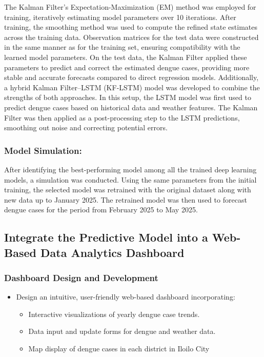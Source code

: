 The Kalman Filter's Expectation-Maximization (EM) method was employed for training, iteratively estimating model parameters over 10 iterations. After training, the smoothing method was used to compute the refined state estimates across the training data. Observation matrices for the test data were constructed in the same manner as for the training set, ensuring compatibility with the learned model parameters. On the test data, the Kalman Filter applied these parameters to predict and correct the estimated dengue cases, providing more stable and accurate forecasts compared to direct regression models. Additionally, a hybrid Kalman Filter–LSTM (KF-LSTM) model was developed to combine the strengths of both approaches. In this setup, the LSTM model was first used to predict dengue cases based on historical data and weather features. The Kalman Filter was then applied as a post-processing step to the LSTM predictions, smoothing out noise and correcting potential errors.

\subsubsection{Model Simulation:}
After identifying the best-performing model among all the trained deep learning models, a simulation was conducted. Using the same parameters from the initial training, the selected model was retrained with the original dataset along with new data up to January 2025. The retrained model was then used to forecast dengue cases for the period from February 2025 to May 2025.

\subsection{Integrate the Predictive Model into a Web-Based Data Analytics Dashboard}

\subsubsection{Dashboard Design and Development}
\begin{itemize}
	\item Design an intuitive, user-friendly web-based dashboard incorporating:
	\begin{itemize}
		\item Interactive visualizations of yearly dengue case trends.
		\item Data input and update forms for dengue and weather data.
		\item Map display of dengue cases in each district in Iloilo City
	\end{itemize}
\end{itemize}

